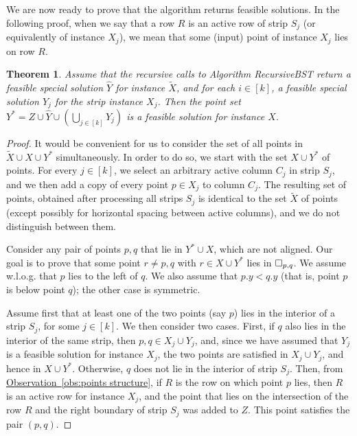 \documentclass[11pt]{article}
\numberwithin{equation}{section}
\newtheorem{theorem}{Theorem}[section]
\theoremstyle{definition}
\theoremstyle{plain}
\newcommand{\expref}[2]{\hyperref[#2]{#1~\ref{#2}}}
\begin{document}
We are now ready to prove that the algorithm returns feasible solutions.
In the following proof, when we say that a row $R$ is an active row of strip $S_j$ (or equivalently of instance $X_j$), we mean that some (input) point of instance $X_j$ lies on row $R$.


\begin{theorem} \label{thm: algorithm feasibility}
	Assume that the recursive calls to Algorithm {\sc RecursiveBST} return a feasible special solution $\hat Y$ for instance $\widetilde{X}$, and for each $i\in [k]$, a feasible special solution $Y_j$ for the strip instance $X_j$. Then the point set $Y^*=Z \cup \hat{Y} \cup (\bigcup_{j \in [k]} Y_j)$ is a feasible solution for instance $X$. 
\end{theorem}

\begin{proof}
	It would be convenient for us to consider the set of all points in  $\widetilde{X}\cup X\cup Y^*$ simultaneously. 
	In order to do so, we start with the set $X\cup Y^*$ of points. For every $j \in [k]$, we select an arbitrary active column $C_j$ in strip $S_j$, and we then add a copy of every point $p\in X_j$ to column $C_j$. The resulting set of points, obtained after processing all strips $S_j$ is identical to the set $\widetilde{X}$ of points (except possibly for horizontal spacing between active columns), and we do not distinguish between them.  
	
	
	Consider any pair of points $p,q$ that lie in $Y^*\cup X$, which are not aligned. Our goal is to prove that some point $r\neq p,q$ with $r\in X\cup Y^*$ lies in $\Box_{p,q}$. We assume w.l.o.g. that $p$ lies to the left of $q$. We also assume that $p.y<q.y$ (that is, point $p$ is below point $q$); the other case is symmetric.
	
	Assume first that at least one of the two points (say $p$) lies in the interior of a strip $S_j$, for some $j \in [k]$. We then consider two cases. First, if $q$ also lies in the interior of the same strip, then $p,q\in X_j \cup Y_j$, and, since we have assumed that $Y_j$ is a feasible solution for instance $X_j$, the two points are satisfied in $X_j\cup Y_j$, and hence in $X\cup Y^*$. Otherwise, $q$ does not lie in the interior of strip $S_j$. Then, from \expref{Observation}{obs:points structure}, if $R$ is the row on which point $p$ lies, then $R$ is an active row for instance $X_j$, and the point that lies on the intersection of the row $R$ and the right boundary of strip $S_j$ was added to $Z$. This point satisfies the pair $(p,q)$.


\end{proof}
\end{document}
